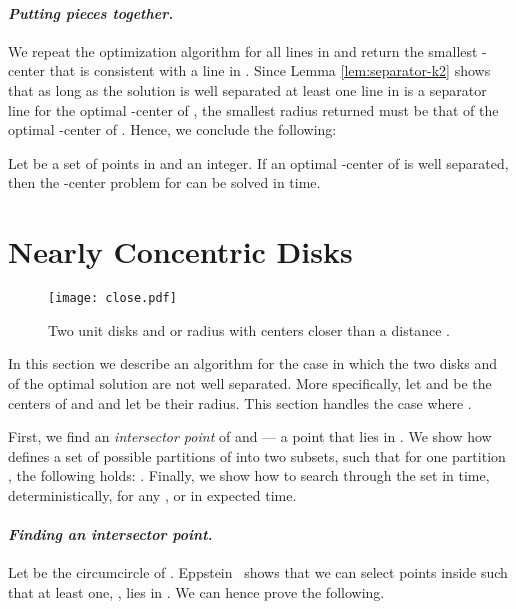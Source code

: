 \documentclass[11pt]{myclass}
\begin{document}
\paragraph{\textbf{\emph{Putting pieces together.}}}
We repeat the optimization algorithm for all lines in  and return the smallest -center that is consistent with a line in .  
Since Lemma \ref{lem:separator-k2} shows that as long as the solution is well separated at least one line in  is a separator line for the optimal -center of , the smallest radius returned must be that of the optimal -center of .
Hence, we conclude the following:

\begin{lemma}
Let  be a set of  points in  and  an integer.  
If an optimal -center of  is well separated, then the -center problem for  can be solved in  time. 
\label{lem:far}
\end{lemma}








\section{Nearly Concentric Disks}
\label{sec:near}

\begin{figure}[ht]
  \centering
  \texttt{[image: close.pdf]}
  \caption{\label{fig:near}
          Two unit disks  and  or radius  with centers closer than a distance .  
      }
\end{figure}


In this section we describe an algorithm for the case in which the two disks  and  of the optimal solution are not well separated.  More specifically, let  and  be the centers of  and  and let  be their radius.  This section handles the case where .  

First, we find an \emph{intersector point}  of  and  --- a point that lies in .  
We show how  defines a set  of  possible partitions of  into two subsets, such that for one partition ,  the following holds: .
Finally, we show how to search through the set  in  time, deterministically, for any , or in  expected time.  

\paragraph{\textbf{\emph{Finding an intersector point.}}}
Let  be the circumcircle of .
Eppstein~\cite{Epp97} shows that we can select  points inside  such that at least one, , lies in .  
We can hence prove the following.
\end{document}
